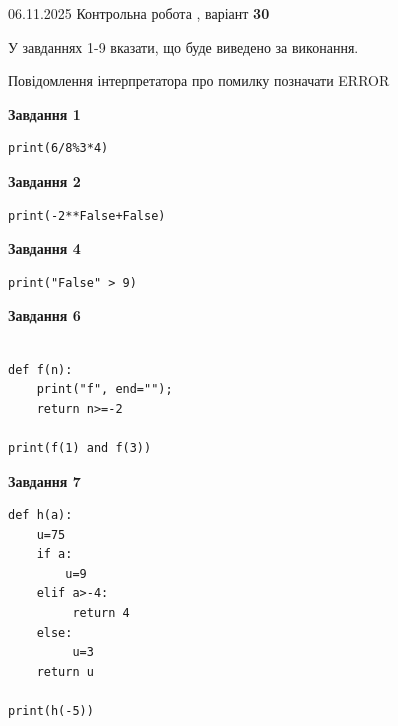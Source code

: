 \documentclass[12pt, ukrainian]{article}
\begin{document}
{\Large{06.11.2025 Контрольна робота , варіант  \No \textbf { 30 }\par}}
{
\begin {large}
У завданнях 1-9 вказати, що буде виведено за виконання.

Повідомлення інтерпретатора про помилку позначати ERROR

\begin{minipage}[t]{7.5cm}

\begin{center}
\textbf{Завдання 1}
\end{center}

\begin{verbatim}
print(6/8%3*4)
\end{verbatim}



\begin{center}
\textbf{Завдання 2}
\end{center}

\begin{verbatim}
print(-2**False+False)
\end{verbatim}



\begin{center}
\textbf{Завдання 4}
\end{center}

\begin{verbatim}
print("False" > 9)
\end{verbatim}



\begin{center}
\textbf{Завдання 6}
\end{center}

\begin{verbatim}

def f(n):
    print("f", end="");
    return n>=-2

print(f(1) and f(3))
\end{verbatim}



\begin{center}
\textbf{Завдання 7}
\end{center}

\begin{verbatim}
def h(a):
    u=75
    if a: 
        u=9
    elif a>-4:
         return 4
    else:
         u=3
    return u

print(h(-5))
\end{verbatim}


\end{minipage}
\end{large}}
\end{document}
